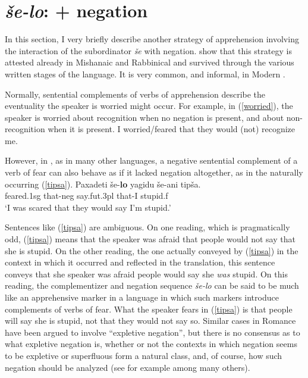 \documentclass[output=paper,colorlinks,citecolor=brown]{langscibook}
\begin{document}
\section{\textit{še-lo}:  + negation}
\label{sec:se-lo}
In this section, I very briefly describe another strategy of apprehension involving the interaction of the subordinator \textit{še } with negation. \citet{rubinsteinetal} show that this strategy is attested already in Mishanaic and Rabbinical  and survived through the various written stages of the language. It is very common, and informal, in Modern .

Normally, sentential complements of verbs of apprehension describe the eventuality the speaker is worried might occur. For example, in (\ref{worried}), the speaker is worried about recognition when no negation is present, and about non-recognition when it is present. 
\ea
I worried/feared  that they would (not) recognize me. \label{worried}
\z

However, in , as in many other languages, a negative sentential complement of a verb of fear can also behave as if it lacked negation altogether, as in the naturally occurring (\ref{tipsa}).
\ea
\label{tipsa}
\gll Paxadeti še-\textbf{lo} yagidu še-ani tipša. \\
feared.{\sc 1sg} that-{\sc neg} say.{\sc fut.3pl} that-I stupid.{\sc f} \\
\glt `I was scared that they would say I'm stupid.'
\z

Sentences like (\ref{tipsa}) are ambiguous. On one reading, which is pragmatically odd, (\ref{tipsa}) means that the speaker was afraid that people would not say that she is stupid. On the other reading, the one actually conveyed by (\ref{tipsa}) in the context in which it occurred and reflected in the translation, this sentence conveys that she speaker was afraid people would say she \textit{was} stupid. On this reading, the complementizer and negation sequence \textit{še-lo} can be said to be much like an apprehensive marker in a language in which such markers introduce complements of verbs of fear. What the speaker fears in (\ref{tipsa}) is that people will say she is stupid, not that they would not say so. Similar cases in Romance have been argued to involve ``expletive negation'', but there is no consensus as to what expletive negation is, whether or not  the contexts in which negation seems to be expletive or superfluous form a natural class, and, of course, how such negation should be analyzed (see for example \citealt{vanderwurff99, abels05, eilam09, yoon11, makri13, puskas17, dobrushina21} among many others).
\end{document}
